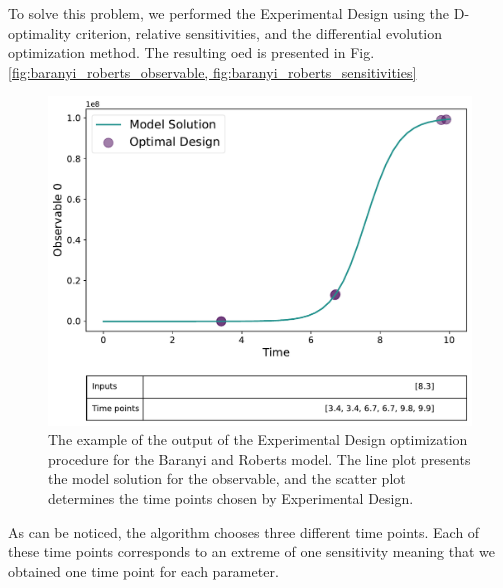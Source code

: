 \documentclass[10pt,A4paper]{article}
\begin{document}
To solve this problem, we performed the Experimental Design using the D-optimality criterion, relative sensitivities, and the differential evolution optimization method.
The resulting \ac{oed} is presented in Fig. \ref{fig:baranyi_roberts_observable, fig:baranyi_roberts_sensitivities}
\begin{figure}[H]
    \centering
    \includegraphics[scale=0.43]{Figures/Observables_Result_baranyi_roberts_ode_fisher_determinant_rel_sensit_cont_6times_1temps_v20_000_x_00.pdf}
    \caption{{\footnotesize The example of the output of the Experimental Design optimization procedure for the Baranyi and Roberts model. 
    The line plot presents the model solution for the observable, and the scatter plot determines the time points chosen by Experimental Design.}}
    \label{fig:baranyi_roberts_observable}
\end{figure}
As can be noticed, the algorithm chooses three different time points.
Each of these time points corresponds to an extreme of one sensitivity meaning that we obtained one time point for each parameter.
\end{document}
